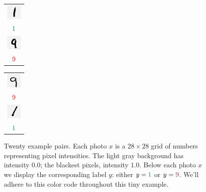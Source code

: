 \documentclass[11pt, justified]{tufte-book}
\theoremstyle{definition}
\begin{document}
\begin{figure}
          \begin{tabular}{c}\includegraphics[width=0.75cm]{example-mnist/mnist-trn-08}\\$\cya{1}$\\\includegraphics[width=0.75cm]{example-mnist/mnist-trn-18}\\$\red{9}$\end{tabular}%
          \begin{tabular}{c}\includegraphics[width=0.75cm]{example-mnist/mnist-trn-09}\\$\red{9}$\\\includegraphics[width=0.75cm]{example-mnist/mnist-trn-19}\\$\cya{1}$\end{tabular}%
          \caption{
            Twenty example pairs.  Each photo $x$ is a $28\times 28$ grid of
            numbers representing pixel intensities.  The light gray background
            has intensity $0.0$; the blackest pixels, intensity $1.0$.  Below
            each photo $x$ we display the corresponding label $y$:
            either $y= {\cya{1}}$ or
            $y={\red{9}}$.
            We'll adhere to this color code throughout this tiny example.
          }
        \end{figure}
\end{document}
